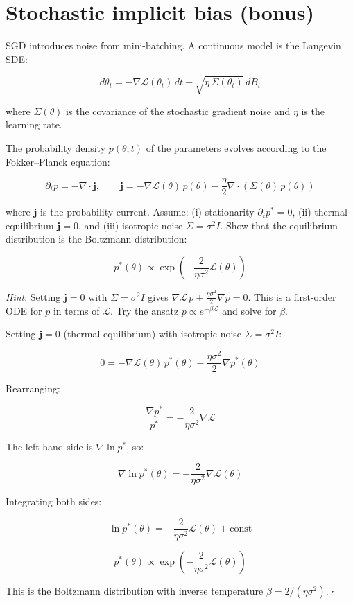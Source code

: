\documentclass[11pt]{article}
\begin{document}
\section{Stochastic implicit bias (bonus)}
\label{sec:td-stochastic}

SGD introduces noise from mini-batching. A continuous model is the Langevin SDE:

\[d\theta_t = -\nabla \mathcal{L}(\theta_t)\,dt + \sqrt{\eta\,\Sigma(\theta_t)}\,dB_t\]

where \(\Sigma(\theta)\) is the covariance of the stochastic gradient
noise and \(\eta\) is the learning rate.

\begin{exercise}
\label{ex:td-6a}
The probability density \(p(\theta, t)\) of the parameters
evolves according to the Fokker--Planck equation:

\[\partial_t p = -\nabla \cdot \mathbf{j}, \qquad \mathbf{j} = -\nabla \mathcal{L}(\theta)\,p(\theta) - \frac{\eta}{2}\nabla \cdot \left(\Sigma(\theta)\,p(\theta)\right)\]

where \(\mathbf{j}\) is the probability current. Assume: (i)
stationarity \(\partial_t p^* = 0\), (ii) thermal equilibrium
\(\mathbf{j} = 0\), and (iii) isotropic noise \(\Sigma = \sigma^2 I\).
Show that the equilibrium distribution is the Boltzmann distribution:

\[p^*(\theta) \propto \exp\left(-\frac{2}{\eta \sigma^2}\mathcal{L}(\theta)\right)\]

\emph{Hint}: Setting \(\mathbf{j} = 0\) with \(\Sigma = \sigma^2 I\)
gives \(\nabla \mathcal{L}\, p + \frac{\eta\sigma^2}{2}\nabla p = 0\).
This is a first-order ODE for \(p\) in terms of \(\mathcal{L}\). Try the
ansatz \(p \propto e^{-\beta \mathcal{L}}\) and solve for \(\beta\).
\end{exercise}

\begin{solution}[ex:td-6a]
Setting \(\mathbf{j} = 0\) (thermal equilibrium) with
isotropic noise \(\Sigma = \sigma^2 I\):

\[0 = -\nabla\mathcal{L}(\theta)\,p^*(\theta) - \frac{\eta\sigma^2}{2}\nabla p^*(\theta)\]

Rearranging:

\[\frac{\nabla p^*}{p^*} = -\frac{2}{\eta\sigma^2}\nabla\mathcal{L}\]

The left-hand side is \(\nabla\ln p^*\), so:

\[\nabla\ln p^*(\theta) = -\frac{2}{\eta\sigma^2}\nabla\mathcal{L}(\theta)\]

Integrating both sides:

\[\ln p^*(\theta) = -\frac{2}{\eta\sigma^2}\mathcal{L}(\theta) + \text{const}\]

\[\boxed{p^*(\theta) \propto \exp\!\left(-\frac{2}{\eta\sigma^2}\mathcal{L}(\theta)\right)}\]

This is the Boltzmann distribution with inverse temperature
\(\beta = 2/(\eta\sigma^2)\). \(\square\)
\end{solution}
\end{document}
